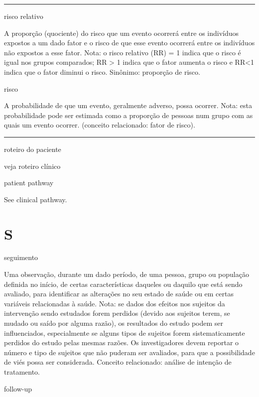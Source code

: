 \documentclass[
]{book}
\begin{document}
\begin{center}\rule{0.5\linewidth}{0.5pt}\end{center}

risco relativo

A proporção (quociente) do risco que um evento ocorrerá entre os indivíduos expostos a um dado fator e o risco de que esse evento ocorrerá entre os indivíduos não expostos a esse fator. Nota: o risco relativo (RR) = 1 indica que o risco é igual nos grupos comparados; RR \textgreater{} 1 indica que o fator aumenta o risco e RR\textless1 indica que o fator diminui o risco. Sinônimo: proporção de risco.

risco

A probabilidade de que um evento, geralmente adverso, possa ocorrer. Nota: esta probabilidade pode ser estimada como a proporção de pessoas num grupo com as quais um evento ocorrer. (conceito relacionado: fator de risco).

\begin{center}\rule{0.5\linewidth}{0.5pt}\end{center}

roteiro do paciente

veja roteiro clínico

patient pathway

See clinical pathway.

\hypertarget{s}{%
\chapter*{S}\label{s}}

seguimento

Uma observação, durante um dado período, de uma pessoa, grupo ou população definida no início, de certas características daqueles ou daquilo que está sendo avaliado, para identificar as alterações no seu estado de saúde ou em certas variáveis relacionadas à saúde. Nota: se dados dos efeitos nos sujeitos da intervenção sendo estudados forem perdidos (devido aos sujeitos terem, se mudado ou saído por alguma razão), os resultados do estudo podem ser influenciados, especialmente se alguns tipos de sujeitos forem sistematicamente perdidos do estudo pelas mesmas razões. Os investigadores devem reportar o número e tipo de sujeitos que não puderam ser avaliados, para que a possibilidade de viés possa ser considerada. Conceito relacionado: análise de intenção de tratamento.

follow-up
\end{document}
